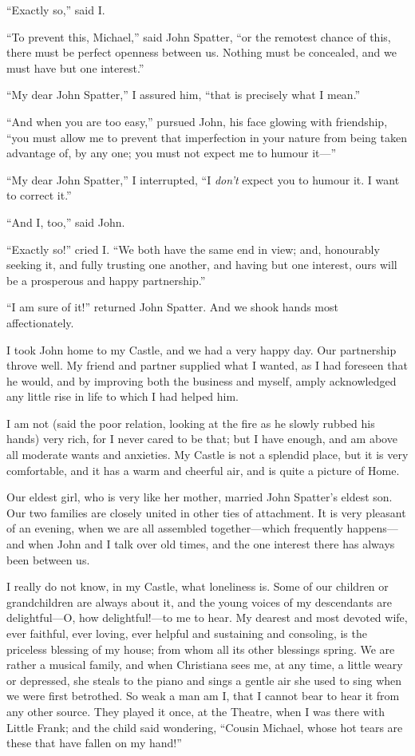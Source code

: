 ``Exactly so,'' said I.

``To prevent this, Michael,'' said John Spatter, ``or the remotest
chance of this, there must be perfect openness between us.  Nothing
must be concealed, and we must have but one interest.''

``My dear John Spatter,'' I assured him, ``that is precisely what I
mean.''

``And when you are too easy,'' pursued John, his face glowing with
friendship, ``you must allow me to prevent that imperfection in your
nature from being taken advantage of, by any one; you must not
expect me to humour it---''

``My dear John Spatter,'' I interrupted, ``I \emph{don't} expect you to humour
it.  I want to correct it.''

``And I, too,'' said John.

``Exactly so!'' cried I.  ``We both have the same end in view; and,
honourably seeking it, and fully trusting one another, and having
but one interest, ours will be a prosperous and happy partnership.''

``I am sure of it!'' returned John Spatter.  And we shook hands most
affectionately.

I took John home to my Castle, and we had a very happy day.  Our
partnership throve well.  My friend and partner supplied what I
wanted, as I had foreseen that he would, and by improving both the
business and myself, amply acknowledged any little rise in life to
which I had helped him.


I am not (said the poor relation, looking at the fire as he slowly
rubbed his hands) very rich, for I never cared to be that; but I
have enough, and am above all moderate wants and anxieties.  My
Castle is not a splendid place, but it is very comfortable, and it
has a warm and cheerful air, and is quite a picture of Home.

Our eldest girl, who is very like her mother, married John Spatter's
eldest son.  Our two families are closely united in other ties of
attachment.  It is very pleasant of an evening, when we are all
assembled together---which frequently happens---and when John and I
talk over old times, and the one interest there has always been
between us.

I really do not know, in my Castle, what loneliness is.  Some of our
children or grandchildren are always about it, and the young voices
of my descendants are delightful---O, how delightful!---to me to hear.
My dearest and most devoted wife, ever faithful, ever loving, ever
helpful and sustaining and consoling, is the priceless blessing of
my house; from whom all its other blessings spring.  We are rather a
musical family, and when Christiana sees me, at any time, a little
weary or depressed, she steals to the piano and sings a gentle air
she used to sing when we were first betrothed.  So weak a man am I,
that I cannot bear to hear it from any other source.  They played it
once, at the Theatre, when I was there with Little Frank; and the
child said wondering, ``Cousin Michael, whose hot tears are these
that have fallen on my hand!''

